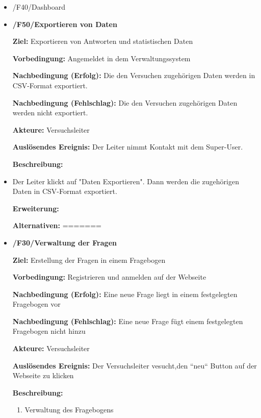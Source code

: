 \documentclass[a4paper]{scrreprt}
\begin{document}
\begin{itemize}
	            \item /F40/Dashboard
	            	\par 
	            	
	            \item \textbf{/F50/Exportieren von Daten}
	            
	            \par \textbf{Ziel: }Exportieren von Antworten und statistischen Daten
	            \par \textbf{Vorbedingung: }Angemeldet in dem Verwaltungssystem
	            \par \textbf{Nachbedingung (Erfolg): }Die den Versuchen zugehörigen Daten werden in CSV-Format exportiert.
	            \par \textbf{Nachbedingung (Fehlschlag): }Die den Versuchen zugehörigen Daten werden nicht exportiert.
	            \par \textbf{Akteure: }Versuchsleiter
	            \par \textbf{Auslösendes Ereignis: }Der Leiter nimmt Kontakt mit dem Super-User.
	            \par \textbf{Beschreibung: }
	            	\item Der Leiter klickt auf "Daten Exportieren". Dann werden die zugehörigen Daten in CSV-Format exportiert.
	            \par \textbf{Erweiterung: }
	            \par \textbf{Alternativen: }
=======
	            \item \textbf{/F30/Verwaltung der Fragen }
	            	\par \textbf{Ziel: }Erstellung der Fragen in einem Fragebogen
	            	\par \textbf{Vorbedingung: } Registrieren und anmelden auf der Webseite
	            	\par \textbf{Nachbedingung (Erfolg): }Eine neue Frage liegt in einem festgelegten Fragebogen vor
	            	\par \textbf{Nachbedingung (Fehlschlag): }Eine neue Frage fügt einem festgelegten Fragebogen nicht hinzu
	            	\par \textbf{Akteure: }Versuchsleiter
	            	\par \textbf{Auslösendes Ereignis: }Der Versuchsleiter vesucht,den “neu“ Button auf der Webseite zu klicken
	            	\par \textbf{Beschreibung: }
		            	\begin{enumerate}
			            	\item Verwaltung des Fragebogens

\end{enumerate}
\end{itemize}
\end{document}
